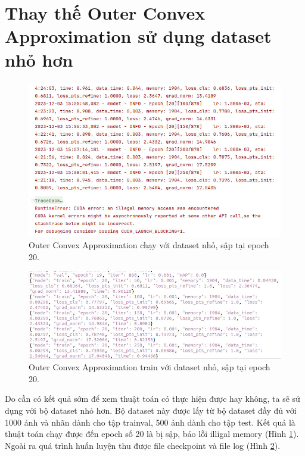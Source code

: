 \documentclass[12pt,a4paper,openany,oneside]{report}
\begin{document}
\section{Thay thế Outer Convex Approximation sử dụng dataset nhỏ hơn}

\begin{figure}[ht!]
	\begin{center}
		\includegraphics[width=450px]{./mmrotate8_1000p_epoch20.JPG}
		\caption{Outer Convex Approximation chạy với dataset nhỏ, sập tại epoch 20.}
		\label{mmrotate8_1000p_epoch20}
	\end{center}
\end{figure} 

\begin{figure}[ht!]
	\begin{center}
		\includegraphics[width=450px]{./ket_qua_file_none_log_json.JPG}
		\caption{Outer Convex Approximation train với dataset nhỏ, sập tại epoch 20.}
		\label{ket_qua_file_none_log_json}
	\end{center}
\end{figure} 
Do cần có kết quả sớm để xem thuật toán có thực hiện được hay không, ta sẽ sử dụng với bộ dataset nhỏ hơn. Bộ dataset này được lấy từ bộ dataset đầy đủ với 1000 ảnh và nhãn dành cho tập trainval, 500 ảnh dành cho tập test. Kết quả là thuật toán chạy được đến epoch số 20 là bị sập, báo lỗi illigal memory (Hình \ref{mmrotate8_1000p_epoch20}). Ngoài ra quá trình huấn luyện thu được file checkpoint  và file log (Hình \ref{ket_qua_file_none_log_json}).
\end{document}
